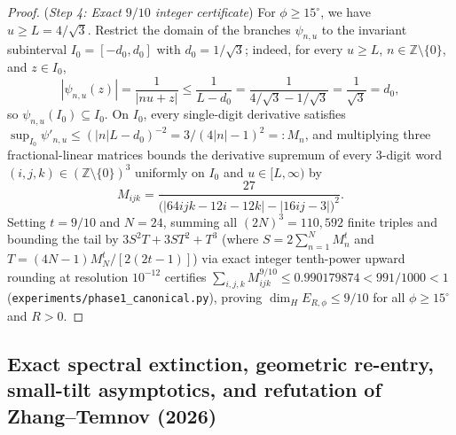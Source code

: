 \documentclass[11pt,reqno]{amsart}
\theoremstyle{definition}
\theoremstyle{remark}
\newcommand{\Z}{\mathbb{Z}}
\begin{document}
\begin{proof}
(\emph{Step 4: Exact $9/10$ integer certificate}) For $\phi \ge 15^\circ$, we have $u \ge L = 4/\sqrt{3}$. Restrict the domain of the branches $\psi_{n,u}$ to the invariant subinterval $I_0 = [-d_0, d_0]$ with $d_0 = 1/\sqrt{3}$; indeed, for every $u \ge L$, $n \in \Z \setminus \{0\}$, and $z \in I_0$,
\[
  |\psi_{n,u}(z)| = \frac{1}{|nu + z|} \le \frac{1}{L - d_0} = \frac{1}{4/\sqrt{3} - 1/\sqrt{3}} = \frac{1}{\sqrt{3}} = d_0,
\]
so $\psi_{n,u}(I_0) \subseteq I_0$. On $I_0$, every single-digit derivative satisfies $\sup_{I_0} \psi'_{n,u} \le (|n|L - d_0)^{-2} = 3/(4|n|-1)^2 =: M_n$, and multiplying three fractional-linear matrices bounds the derivative supremum of every 3-digit word $(i,j,k) \in (\Z\setminus\{0\})^3$ uniformly on $I_0$ and $u \in [L,\infty)$ by
\[
  M_{ijk} = \frac{27}{\bigl(|64ijk - 12i - 12k| - |16ij - 3|\bigr)^2}.
\]
Setting $t = 9/10$ and $N = 24$, summing all $(2N)^3 = 110{,}592$ finite triples and bounding the tail by $3S^2 T + 3ST^2 + T^3$ (where $S = 2\sum_{n=1}^N M_n^t$ and $T = (4N-1)M_N^t/[2(2t-1)]$) via exact integer tenth-power upward rounding at resolution $10^{-12}$ certifies $\sum_{i,j,k} M_{ijk}^{9/10} \le 0.990179874 < 991/1000 < 1$ (\texttt{experiments/phase1\_canonical.py}), proving $\dim_H E_{R,\phi} \le 9/10$ for all $\phi \ge 15^\circ$ and $R > 0$.
\end{proof}

\subsection{Exact spectral extinction, geometric re-entry, small-tilt asymptotics, and refutation of Zhang--Temnov (2026)}
\end{document}
